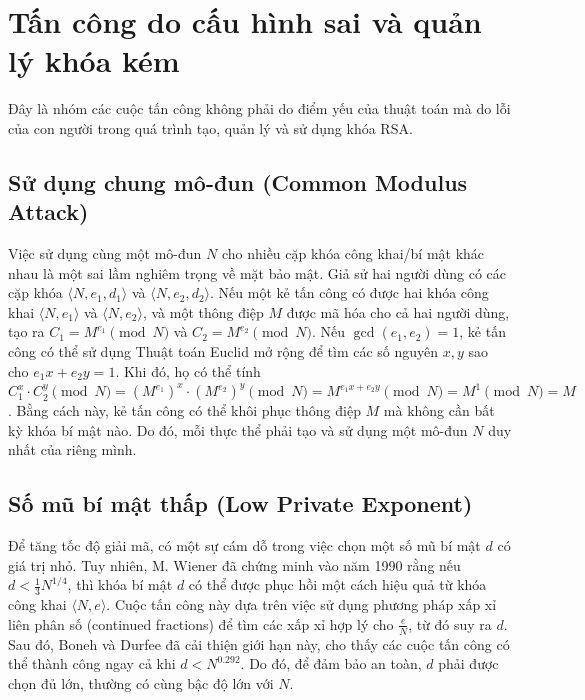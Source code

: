 \documentclass[12pt, a4paper]{article}
\begin{document}
\section{Tấn công do cấu hình sai và quản lý khóa kém}

Đây là nhóm các cuộc tấn công không phải do điểm yếu của thuật toán mà do lỗi của con người trong quá trình tạo, quản lý và sử dụng khóa RSA.

\subsection{Sử dụng chung mô-đun (Common Modulus Attack)}
Việc sử dụng cùng một mô-đun $N$ cho nhiều cặp khóa công khai/bí mật khác nhau là một sai lầm nghiêm trọng về mặt bảo mật. Giả sử hai người dùng có các cặp khóa $\langle N, e_1, d_1 \rangle$ và $\langle N, e_2, d_2 \rangle$. Nếu một kẻ tấn công có được hai khóa công khai $\langle N, e_1 \rangle$ và $\langle N, e_2 \rangle$, và một thông điệp $M$ được mã hóa cho cả hai người dùng, tạo ra $C_1 = M^{e_1} \pmod{N}$ và $C_2 = M^{e_2} \pmod{N}$. Nếu $\gcd(e_1, e_2)=1$, kẻ tấn công có thể sử dụng Thuật toán Euclid mở rộng để tìm các số nguyên $x, y$ sao cho $e_1x + e_2y = 1$. Khi đó, họ có thể tính $C_1^x \cdot C_2^y \pmod{N} = (M^{e_1})^x \cdot (M^{e_2})^y \pmod{N} = M^{e_1x + e_2y} \pmod{N} = M^1 \pmod{N} = M$. Bằng cách này, kẻ tấn công có thể khôi phục thông điệp $M$ mà không cần bất kỳ khóa bí mật nào. Do đó, mỗi thực thể phải tạo và sử dụng một mô-đun $N$ duy nhất của riêng mình.

\subsection{Số mũ bí mật thấp (Low Private Exponent)}
Để tăng tốc độ giải mã, có một sự cám dỗ trong việc chọn một số mũ bí mật $d$ có giá trị nhỏ. Tuy nhiên, M. Wiener đã chứng minh vào năm 1990 rằng nếu $d < \frac{1}{3}N^{1/4}$, thì khóa bí mật $d$ có thể được phục hồi một cách hiệu quả từ khóa công khai $\langle N, e \rangle$. Cuộc tấn công này dựa trên việc sử dụng phương pháp xấp xỉ liên phân số (continued fractions) để tìm các xấp xỉ hợp lý cho $\frac{e}{N}$, từ đó suy ra $d$. Sau đó, Boneh và Durfee đã cải thiện giới hạn này, cho thấy các cuộc tấn công có thể thành công ngay cả khi $d < N^{0.292}$. Do đó, để đảm bảo an toàn, $d$ phải được chọn đủ lớn, thường có cùng bậc độ lớn với $N$.
\end{document}
